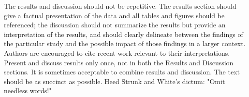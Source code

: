 The results and discussion should not be repetitive. The results section should give a factual 
presentation of the data and all tables and figures should be referenced; the discussion 
should not summarize the results but provide an interpretation of the results, and should 
clearly delineate between the findings of the particular study and the possible impact 
of those findings in a larger context. Authors are encouraged to cite recent work 
relevant to their interpretations. Present and discuss results only once, not in 
both the Results and Discussion sections. It is sometimes acceptable to combine 
results and discussion. The text should be as succinct as possible. 
Heed Strunk and White's dictum: "Omit needless words!"

\ifdefined\showtablesandfigures
\fi

\ifdefined\showtablesandfigures
\fi

\ifdefined\showtablesandfigures
\fi

